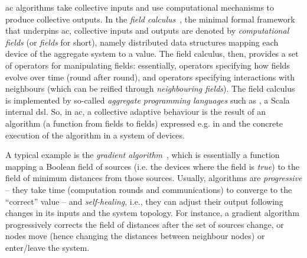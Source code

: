 \ac{ac} algorithms 
 take collective inputs
 and use computational mechanisms
 to produce collective outputs.
%
In the \emph{field calculus}~\cite{DBLP:journals/jlap/ViroliBDACP19},
 the minimal formal framework 
 that underpins \ac{ac},
 collective inputs and outputs are denoted by
 \emph{computational fields} (or \emph{fields} for short), namely
 distributed data structures 
 mapping each device of the aggregate system to a value.
%
The field calculus, then, provides a set of operators
 for manipulating fields:
 essentially, operators specifying how fields evolve over time (round after round),
 and operators specifying interactions with neighbours
 (which can be reified through \emph{neighbouring fields}).
%
%
The field calculus is implemented by so-called \emph{aggregate programming languages} such as \scafi{}, a Scala internal \ac{dsl}.
%
So, in \ac{ac}, a collective adaptive behaviour
 is the result of an algorithm (a function from fields to fields) expressed e.g. in \scafi{}
 and the concrete execution of the algorithm
 in a system of devices.
%

A typical example is the \emph{gradient algorithm}~\cite{DBLP:conf/saso/AudritoCDV17},
 which is essentially a function mapping a Boolean field of sources (i.e. the devices where the field is \emph{true})
 to the field of minimum distances from those sources.
%
Usually, algorithms are \emph{progressive} -- they take time (computation rounds and communications) to converge to the ``correct'' value --
and \emph{self-healing}, i.e., they can adjust their output following changes in its inputs and the system topology.
%
For instance, a gradient algorithm progressively corrects the field of distances after the set of sources change, or nodes move (hence changing the distances between neighbour nodes) or enter/leave the system.
%

